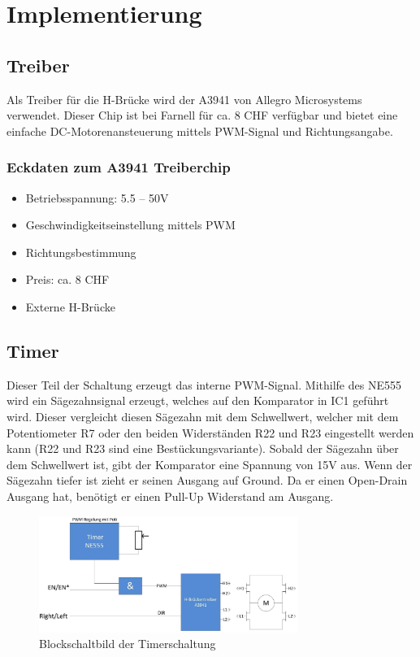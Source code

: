 \newpage
\section{Implementierung}

\subsection{Treiber}
Als Treiber für die H-Brücke wird der A3941 von Allegro Microsystems 
verwendet. Dieser Chip ist bei Farnell für ca. 8 CHF verfügbar und bietet eine 
einfache DC-Motorenansteuerung mittels PWM-Signal und Richtungsangabe.

\subsubsection*{Eckdaten zum A3941 Treiberchip}
\begin{itemize}
	\item Betriebsspannung: 5.5 – 50\si{\volt}
	\item Geschwindigkeitseinstellung mittels PWM
	\item Richtungsbestimmung
	\item Preis: ca. 8 CHF
	\item Externe H-Brücke
\end{itemize}

\subsection{Timer}
Dieser Teil der Schaltung erzeugt das interne PWM-Signal. Mithilfe des
NE555 wird ein Sägezahnsignal erzeugt, welches auf den Komparator in IC1
geführt wird. Dieser vergleicht diesen Sägezahn mit dem Schwellwert,
welcher mit dem Potentiometer R7 oder den beiden Widerständen R22 und R23
eingestellt werden kann (R22 und R23 sind eine Bestückungsvariante). 
Sobald der Sägezahn über dem Schwellwert ist, gibt der Komparator eine Spannung 
von 15\si{\volt} aus. Wenn der Sägezahn tiefer ist zieht er seinen Ausgang 
auf Ground. Da er einen Open-Drain Ausgang hat, benötigt er einen Pull-Up 
Widerstand am Ausgang.

\begin{figure}[h!]
	\centering
	\includegraphics[width=0.75\textwidth]{src/dc/fig/timer_block.png}
	\caption{Blockschaltbild der Timerschaltung}
\end{figure}

